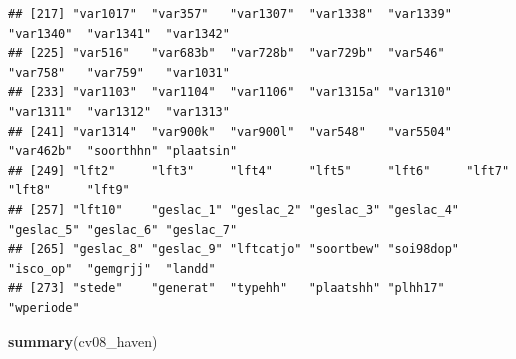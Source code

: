 \documentclass[
]{book}
\newenvironment{Shaded}{\begin{snugshade}}{\end{snugshade}}
\newcommand{\KeywordTok}[1]{\textcolor[rgb]{0.13,0.29,0.53}{\textbf{#1}}}
\newcommand{\NormalTok}[1]{#1}
\begin{document}
\begin{verbatim}
## [217] "var1017"  "var357"   "var1307"  "var1338"  "var1339"  "var1340"  "var1341"  "var1342" 
## [225] "var516"   "var683b"  "var728b"  "var729b"  "var546"   "var758"   "var759"   "var1031" 
## [233] "var1103"  "var1104"  "var1106"  "var1315a" "var1310"  "var1311"  "var1312"  "var1313" 
## [241] "var1314"  "var900k"  "var900l"  "var548"   "var5504"  "var462b"  "soorthhn" "plaatsin"
## [249] "lft2"     "lft3"     "lft4"     "lft5"     "lft6"     "lft7"     "lft8"     "lft9"    
## [257] "lft10"    "geslac_1" "geslac_2" "geslac_3" "geslac_4" "geslac_5" "geslac_6" "geslac_7"
## [265] "geslac_8" "geslac_9" "lftcatjo" "soortbew" "soi98dop" "isco_op"  "gemgrjj"  "landd"   
## [273] "stede"    "generat"  "typehh"   "plaatshh" "plhh17"   "wperiode"
\end{verbatim}

\begin{Shaded}
\begin{Highlighting}[numbers=left,,]
\KeywordTok{summary}\NormalTok{(cv08_haven)}
\end{Highlighting}
\end{Shaded}
\end{document}

